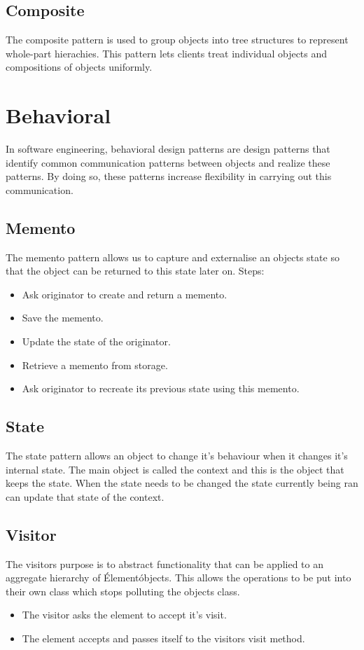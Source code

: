 \subsection{Composite}
The composite pattern is used to group objects into tree structures to represent whole-part hierachies. This pattern lets clients treat individual objects and compositions of objects uniformly. \cite{sourcemaking}

\section{Behavioral}
In software engineering, behavioral design patterns are design patterns that identify common communication patterns between objects and realize these patterns. By doing so, these patterns increase flexibility in carrying out this communication. \cite{sourcemaking}

\subsection{Memento}
The memento pattern allows us to capture and externalise an objects state so that the object can be returned to this state later on.
Steps:
\begin{itemize}
	\item Ask originator to create and return a memento.
	\item Save the memento.
	\item Update the state of the originator.
	\item Retrieve a memento from storage.
	\item Ask originator to recreate its previous state using this memento.
\end{itemize}

\subsection{State}
The state pattern allows an object to change it's behaviour when it changes it's internal state. The main object is called the context and this is the object that keeps the state. When the state needs to be changed the state currently being ran can update that state of the context.

\subsection{Visitor}
The visitors purpose is to abstract functionality that can be applied to an aggregate hierarchy of \'Element\' objects. \cite{sourcemaking} This allows the operations to be put into their own class which stops polluting the objects class.
\begin{itemize}
	\item The visitor asks the element to accept it's visit.
	\item The element accepts and passes itself to the visitors visit method.
\end{itemize}

